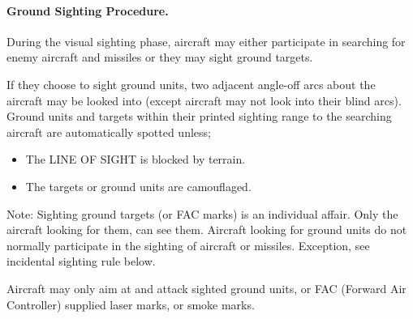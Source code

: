 \paragraph{Ground Sighting Procedure.} During the visual sighting phase, aircraft may either participate in searching for enemy aircraft and missiles or they may sight ground targets.

If they choose to sight ground units, two adjacent angle-off arcs about the aircraft may be looked into (except aircraft may not look into their blind arcs). Ground units and targets within their printed sighting range to the searching aircraft are automatically spotted unless;

\begin{itemize}
    \item The LINE OF SIGHT is blocked by terrain.
    \item The targets or ground units are camouflaged.
\end{itemize}

Note: Sighting ground targets (or FAC marks) is an individual affair. Only the aircraft looking for them, can see them. Aircraft looking for ground units do not normally participate in the sighting of aircraft or missiles. Exception, see incidental sighting rule below.

Aircraft may only aim at and attack sighted ground units, or FAC (Forward Air Controller) supplied laser marks, or smoke marks.



